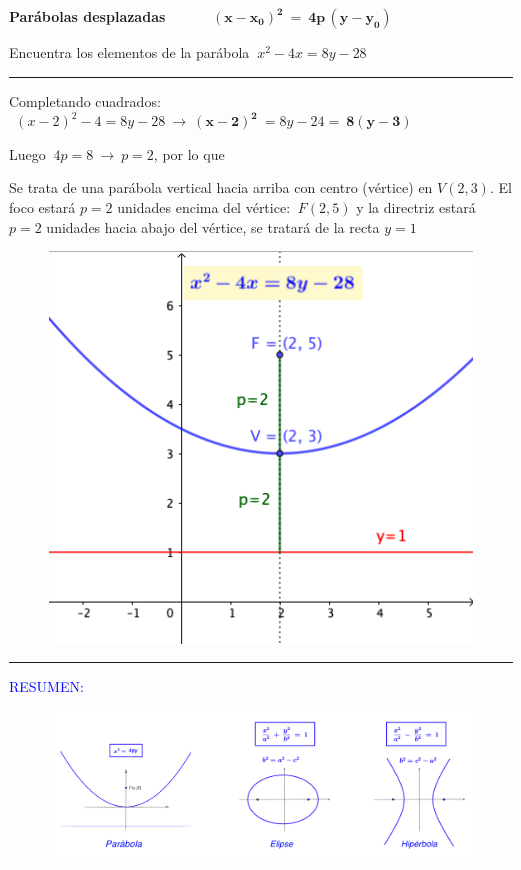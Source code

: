 \vspace{5mm} \textbf{Parábolas desplazadas} $\qquad \quad \boldsymbol{(x-x_0)^2 \ = \ 4p\, (y-y_0)}$

\vspace{5mm} 
\begin{miejercicio}

Encuentra los elementos de la parábola $\ x^2-4x=8y-28$

\rule{250pt}{0.1pt}

\begin{multicols}{2}
\vspace{2mm}	Completando cuadrados: $\ \  (x-2)^2-4=8y-28 \ \to \ \boldsymbol{(x-2)^2} \ =8y-24 =\ \boldsymbol{ 8(y-3)}$

\vspace{2mm} Luego $\ 4p=8 \ \to \ p=2$, por lo que

\vspace{2mm} Se trata de una parábola vertical hacia arriba con centro (vértice) en $V(2,3)$. El foco estará $p=2$ unidades encima del vértice: $\ F(2,5)$ y la directriz estará $p=2$ unidades hacia abajo del vértice, se tratará de la recta $y=1$

\begin{figure}[H]
			\centering
			\includegraphics[width=.4\textwidth]{img-conicas/conicas42.png}
	\end{figure}
\end{multicols}
\end{miejercicio}

\begin{center} \rule{250pt}{0.2pt} \end{center}	

\vspace{5mm}

\begin{cuadro-naranja}
\textcolor{blue}{RESUMEN:}
\vspace{-3mm}
\begin{figure}[H]
	\centering
	\includegraphics[width=.95\textwidth]{img-conicas/conicas14.png}
	\end{figure}
\end{cuadro-naranja}

